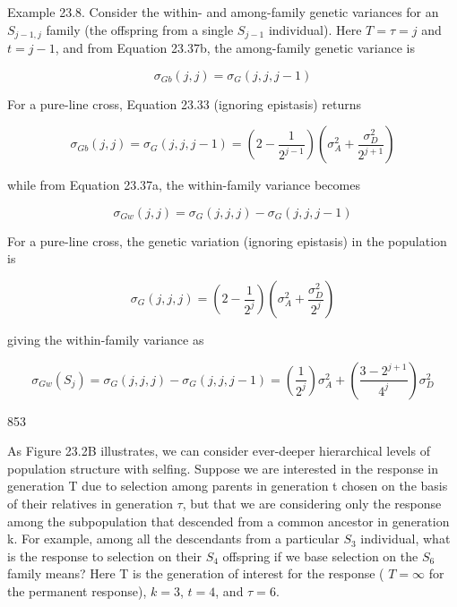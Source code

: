 \documentclass{article}
\begin{document}
Example 23.8. Consider the within- and among-family genetic variances for an  $ S_{j-1,j} $ family (the offspring from a single  $ S_{j-1} $ individual). Here  $ T = \tau = j $ and  $ t = j - 1 $, and from Equation 23.37b, the among-family genetic variance is

\begin{equation}
\sigma_{Gb}(j,j)=\sigma_{G}(j,j,j-1)
\end{equation}

For a pure-line cross, Equation 23.33 (ignoring epistasis) returns

\begin{equation}
\sigma_{Gb}(j,j)=\sigma_{G}(j,j,j-1)=\left(2-\frac{1}{2^{j-1}}\right)\left(\sigma_{A}^{2}+\frac{\sigma_{D}^{2}}{2^{j+1}}\right)
\end{equation}

while from Equation 23.37a, the within-family variance becomes

\begin{equation}
\sigma_{G w}(j,j)=\sigma_{G}(j,j,j)-\sigma_{G}(j,j,j-1)
\end{equation}

For a pure-line cross, the genetic variation (ignoring epistasis) in the population is

\begin{equation}
\sigma_{G}(j,j,j)=\left(2-\frac{1}{2^{j}}\right)\left(\sigma_{A}^{2}+\frac{\sigma_{D}^{2}}{2^{j}}\right)
\end{equation}

giving the within-family variance as

\begin{equation}
\sigma_{G w}(S_{j})=\sigma_{G}(j,j,j)-\sigma_{G}(j,j,j-1)=\left(\frac{1}{2^{j}}\right)\sigma_{A}^{2}+\left(\frac{3-2^{j+1}}{4^{j}}\right)\sigma_{D}^{2}
\end{equation}

853

As Figure 23.2B illustrates, we can consider ever-deeper hierarchical levels of population structure with selfing. Suppose we are interested in the response in generation T due to selection among parents in generation t chosen on the basis of their relatives in generation  $ \tau $, but that we are considering only the response among the subpopulation that descended from a common ancestor in generation k. For example, among all the descendants from a particular  $ S_3 $ individual, what is the response to selection on their  $ S_4 $ offspring if we base selection on the  $ S_6 $ family means? Here T is the generation of interest for the response ( $ T = \infty $ for the permanent response),  $ k = 3 $,  $ t = 4 $, and  $ \tau = 6 $.
\end{document}
